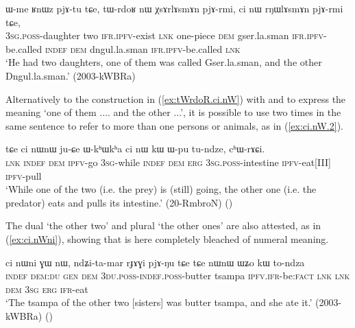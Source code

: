 \begin{exe}
\ex \label{ex:tWrdoR.ci.nW}
 \gll 
ɯ-me ʁnɯz pjɤ-tu tɕe, tɯ-rdoʁ nɯ χsɤrlɤsmɤn pjɤ-rmi, ci nɯ rŋɯlɤsmɤn pjɤ-rmi tɕe, \\
\textsc{3sg}.\textsc{poss}-daughter two \textsc{ifr}.\textsc{ipfv}-exist \textsc{lnk} one-piece \textsc{dem} gser.la.sman \textsc{ifr}.\textsc{ipfv}-be.called \textsc{indef} \textsc{dem} dngul.la.sman \textsc{ifr}.\textsc{ipfv}-be.called \textsc{lnk} \\
\glt `He had two daughters, one of them was called Gser.la.sman, and the other Dngul.la.sman.' (2003-kWBRa)
\end{exe}

Alternatively to the construction in (\ref{ex:tWrdoR.ci.nW}) with  and  to express the meaning `one of them .... and the other ...', it is possible to use  two times in the same sentence to refer to more than one persons or animals, as in (\ref{ex:ci.nW.2}).

\begin{exe}
\ex \label{ex:ci.nW.2}
 \gll tɕe ci nɯnɯ ju-ɕe ɯ-kʰɯkʰa ci nɯ kɯ ɯ-pu tu-ndze, cʰɯ-rɤɕi. \\
\textsc{lnk} \textsc{indef} \textsc{dem} \textsc{ipfv}-go \textsc{3sg}-while \textsc{indef} \textsc{dem} \textsc{erg} \textsc{3sg}.\textsc{poss}-intestine \textsc{ipfv}-eat[III] \textsc{ipfv}-pull \\
\glt `While one of the two (i.e. the prey) is (still) going, the other one (i.e. the predator) eats and pulls its intestine.'  (20-RmbroN)
()
\end{exe}

The dual  `the other two' and plural  `the other ones' are also attested, as in (\ref{ex:ci.nWni}), showing that  is here completely bleached of numeral meaning.

 \begin{exe}
\ex \label{ex:ci.nWni}
 \gll  ci nɯni ɣɯ nɯ, ndʑi-ta-mar rɟɤɣi pjɤ-ŋu tɕe tɕe nɯnɯ ɯʑo kɯ to-ndza \\
\textsc{indef} \textsc{dem}:\textsc{du} \textsc{gen} \textsc{dem} \textsc{3du}.\textsc{poss}-\textsc{indef}.\textsc{poss}-butter tsampa \textsc{ipfv}.\textsc{ifr}-be:\textsc{fact} \textsc{lnk} \textsc{lnk} \textsc{dem} \textsc{3sg} \textsc{erg} \textsc{ifr}-eat \\
\glt `The tsampa of the other two [sisters] was butter tsampa, and she ate it.' (2003-kWBRa)
()
\end{exe}

